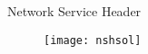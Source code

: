 \appendix

\addtocounter{framenumber}{1}

\begin{frame}{Network Service Header}

  \begin{figure}
    \centering
    \texttt{[image: nshsol]}
  \end{figure}

\end{frame}